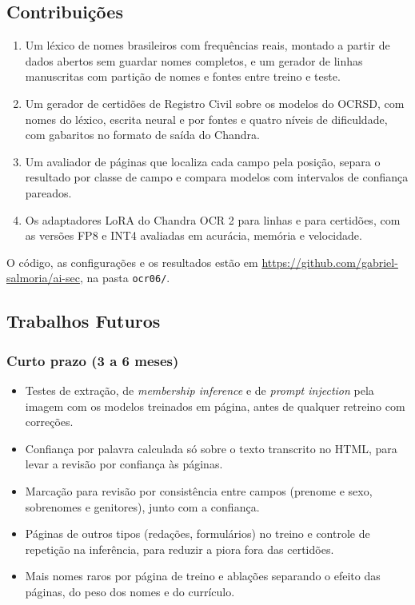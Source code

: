 \subsection{Contribuições}

\begin{enumerate}
    \item Um léxico de nomes brasileiros com frequências reais, montado a partir de dados abertos sem guardar nomes completos, e um gerador de linhas manuscritas com partição de nomes e fontes entre treino e teste.
    \item Um gerador de certidões de Registro Civil sobre os modelos do OCRSD, com nomes do léxico, escrita neural e por fontes e quatro níveis de dificuldade, com gabaritos no formato de saída do Chandra.
    \item Um avaliador de páginas que localiza cada campo pela posição, separa o resultado por classe de campo e compara modelos com intervalos de confiança pareados.
    \item Os adaptadores LoRA do Chandra OCR 2 para linhas e para certidões, com as versões FP8 e INT4 avaliadas em acurácia, memória e velocidade.
\end{enumerate}

O código, as configurações e os resultados estão em \url{https://github.com/gabriel-salmoria/ai-sec}, na pasta \texttt{ocr06/}.

\subsection{Trabalhos Futuros}

\subsubsection{Curto prazo (3 a 6 meses)}
\begin{itemize}
    \item Testes de extração, de \emph{membership inference} e de \emph{prompt injection} pela imagem com os modelos treinados em página, antes de qualquer retreino com correções.
    \item Confiança por palavra calculada só sobre o texto transcrito no HTML, para levar a revisão por confiança às páginas.
    \item Marcação para revisão por consistência entre campos (prenome e sexo, sobrenomes e genitores), junto com a confiança.
    \item Páginas de outros tipos (redações, formulários) no treino e controle de repetição na inferência, para reduzir a piora fora das certidões.
    \item Mais nomes raros por página de treino e ablações separando o efeito das páginas, do peso dos nomes e do currículo.
\end{itemize}

